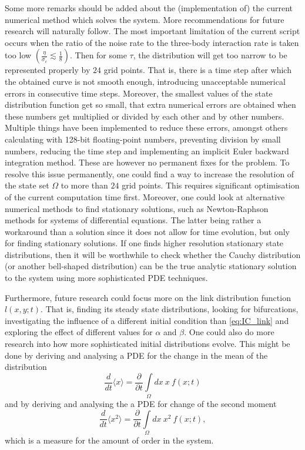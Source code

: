 Some more remarks should be added about the (implementation of) the current numerical method which solves the system. More recommendations for future research will naturally follow. The most important limitation of the current script occurs when the ratio of the noise rate to the three-body interaction rate is taken too low $\left(\frac{\eta}{\sigma_c} \lesssim \frac{1}{8}\right)$. Then for some $\tau$, the distribution will get too narrow to be represented properly by $24$ grid points. That is, there is a time step after which the obtained curve is not smooth enough, introducing unacceptable numerical errors in consecutive time steps. Moreover, the smallest values of the state distribution function get so small, that extra numerical errors are obtained when these numbers get multiplied or divided by each other and by other numbers. Multiple things have been implemented to reduce these errors, amongst others calculating with 128-bit floating-point numbers, preventing division by small numbers, reducing the time step and implementing an implicit Euler backward integration method. These are however no permanent fixes for the problem. To resolve this issue permanently, one could find a way to increase the resolution of the state set $\Omega$ to more than $24$ grid points. This requires significant optimisation of the current computation time first. Moreover, one could look at alternative numerical methods to find stationary solutions, such as Newton-Raphson methods for systems of differential equations. The latter being rather a workaround than a solution since it does not allow for time evolution, but only for finding stationary solutions. If one finds higher resolution stationary state distributions, then it will be worthwhile to check whether the Cauchy distribution (or another bell-shaped distribution) can be the true analytic stationary solution to the system using more sophisticated PDE techniques.

Furthermore, future research could focus more on the link distribution function $l(x,y;t)$. That is, finding its steady state distributions, looking for bifurcations, investigating the influence of a different initial condition than \cref{eq:IC_link} and exploring the effect of different values for $\alpha$ and $\beta$. One could also do more research into how more sophisticated initial distributions evolve. This might be done by deriving and analysing a PDE for the change in the mean of the distribution
\begin{equation}
\frac{d}{dt} \langle x \rangle = \frac{\partial}{\partial t} \int\limits_\Omega dx\ x\ f(x;t)
\end{equation}
and by deriving and analysing the a PDE for change of the second moment
\begin{equation}
\frac{d}{dt} \langle x^2 \rangle = \frac{\partial}{\partial t} \int\limits_\Omega dx\ x^2\ f(x;t),	
\end{equation}
which is a measure for the amount of order in the system.

